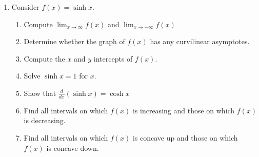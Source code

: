 \documentclass[12pt]{article}
\newif\ifans
\begin{document}
\begin{enumerate}

\item Consider $f(x)=\sinh{x}$.

\begin{enumerate}

\item Compute $\lim_{x \rightarrow \infty}f(x)$ and $\lim_{x \rightarrow -\infty}f(x)$

\ifans{\fbox{$\lim_{x \rightarrow \infty}f(x)=+\infty$; $\lim_{x \rightarrow -\infty}f(x)=-\infty$}} \fi

\item Determine whether the graph of $f(x)$ has any curvilinear asymptotes.

\ifans\fbox{$y=\frac{1}{2}e^x$ and $y=-\frac{1}{2}e^{-x}$} \fi

\item Compute the $x$ and $y$ intercepts of $f(x)$.

\ifans{\fbox{The $x$ and $y$ intercept of $y=\sinh{x}$ is $(0,0)$.}} \fi

\item Solve $\sinh{x}=1$ for $x$.

\ifans{\fbox{$x=\ln{\left(1+\sqrt{2}\right)}$}} \fi

\item Show that $\frac{d}{dx}(\sinh{x})=\cosh{x}$

\ifans{\fbox{\parbox{1\linewidth}{
\begin{align*}
\frac{d}{dx}(\sinh{x}) &= \frac{d}{dx}\left(\frac{e^x-e^{-x}}{2}\right)\\
&=\frac{d}{dx}\left(\frac{1}{2}e^x-\frac{1}{2}e^{-x}\right)\\
&=\frac{1}{2}e^x+\frac{1}{2}e^{-x}\\
&=\frac{e^x+e^{-x}}{2}\\
&=\cosh{x}
\end{align*}
}}} \fi

\item Find all intervals on which $f(x)$ is increasing and those on which $f(x)$ is decreasing.

\ifans\fbox{Increasing on $(-\infty,\infty)$; never decreasing.} \fi

\item Find all intervals on which $f(x)$ is concave up and those on which $f(x)$ is concave down.

\ifans\fbox{Concave up on $(0,\infty)$; concave down on $(-\infty,0)$.} \fi


\end{enumerate}
\end{enumerate}
\end{document}
